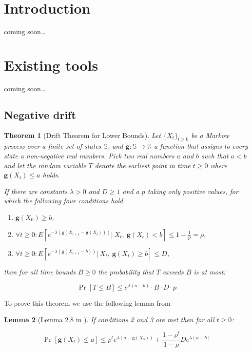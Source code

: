 \documentclass[12pt, a4paper]{article}
\title{\text{Additive drift with tail bounds}}
\author{Vihnin F.
    \and Antipov D.
    \and Sinyachenko N.}
\newcommand{\gfun}{\mathbf{g}}
\newtheorem{theorem}{Theorem}[section]
\newtheorem{lemma}[theorem]{Lemma}
\theoremstyle{remark}
\newcommand{\cm}{coming soon\dots}
\begin{document}
\maketitle

\section{Introduction}
\cm

\section{Existing tools}
\cm
\subsection{Negative drift}
\begin{theorem}[Drift Theorem for Lower Bounds] \label{thm:neat}
    Let $\{X_t\}_{t \ge 0}$ be a Markow process over a finite set of states $\mathbb{S}$, and $\mathbf{g} : \mathbb{S} \rightarrow \mathbb{R}$ a function that assigns to every state a non-negative real numbers. Pick two real numbers $a$ and $b$ such that $a < b$ and let the random variable $T$ denote
    the earliest point in time $t \ge 0$ where $\mathbf{g}(X_t) \leq a$ holds.
    
    If there are constants $\lambda > 0$ and $D \ge 1$ and a $p$ taking only positive values, for which the following four conditions hold
    \renewcommand\labelenumi{(\theenumi)}
    \begin{enumerate}
        \item $\gfun(X_0) \ge b$,
        \item $\forall t \ge 0 : E\left[e^{-\lambda(\gfun(X_{t + 1} - \gfun(X_t)))} |\ X_t,\ \gfun(X_t) < b\right] \leq 1 - \frac{1}{p} = \rho$,
        \item $\forall t \ge 0 : E\left[e^{-\lambda(\gfun(X_{t + 1} - b))} |\ X_t,\ \gfun(X_t) \ge b\right] \leq D$,
    \end{enumerate}
    then for all time bounds $B \ge 0$ the probability that $T$ exceeds $B$ is at most:

    \begin{equation}
        \Pr[T \leq B] \leq e^{\lambda(a - b)} \cdot B \cdot D \cdot p
    \end{equation}
\end{theorem}

To prove this theorem we use the following lemma from \cite{Hajek 82}

\begin{lemma}[Lemma 2.8 in \cite{Hajek 82}] \label{lm:haj}
    If conditions 2 and 3 are met then for all $t \geq 0$:

    $$\Pr[\gfun(X_t) \leq a] \leq \rho^te^{\lambda(a - \gfun(X_0))} + \frac{1 - \rho^t}{1 - \rho} D e^{\lambda(a - b)}$$
    
\end{lemma}
\end{document}

